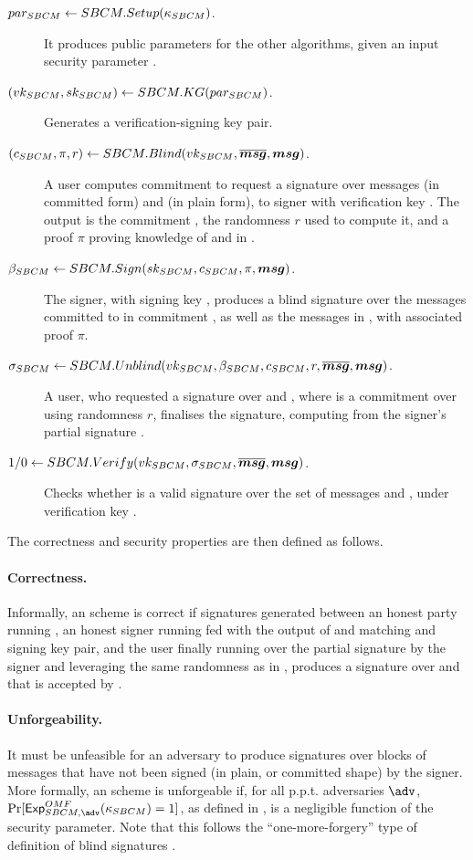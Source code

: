 \begin{description}
\item[$par_{SBCM} \gets SBCM.Setup(\kappa_{SBCM})$.] It produces public parameters
  for the other algorithms, given an input security parameter \SBCMsecpar.
\item[$(vk_{SBCM},sk_{SBCM}) \gets SBCM.KG(par_{SBCM})$.] Generates a
  verification-signing key pair.
\item[$(c_{SBCM},\pi,r) \gets SBCM.Blind(vk_{SBCM},\overline{\boldsymbol{msg}},\boldsymbol{msg})$.] A user
  computes commitment \SBCMcom to request a signature over messages \osmsg (in
  committed form) and \smsg (in plain form), to signer with verification key
  \SBCMvk. The output is the commitment \SBCMcom, the randomness $r$ used to
  compute it, and a proof $\pi$ proving knowledge of \osmsg and \smsg in
  \SBCMcom.
\item[$\beta_{SBCM} \gets SBCM.Sign(sk_{SBCM},c_{SBCM},\pi,\boldsymbol{msg})$.] The
  signer, with signing key \SBCMsk, produces a blind signature \SBCMbsig over
  the messages committed to in commitment \SBCMcom, as well as the messages in
  \smsg, with associated proof $\pi$.
\item[$\sigma_{SBCM} \gets SBCM.Unblind(vk_{SBCM},\beta_{SBCM},c_{SBCM},r,\overline{\boldsymbol{msg}},\boldsymbol{msg})$.]
  A user, who requested a signature over \osmsg and \smsg, where \SBCMcom is a
  commitment over \osmsg using randomness $r$, finalises the signature,
  computing \SBCMsig from the signer's partial signature \SBCMbsig.
\item[$1/0 \gets SBCM.Verify(vk_{SBCM},\sigma_{SBCM},\overline{\boldsymbol{msg}},\boldsymbol{msg})$.] Checks
  whether \SBCMsig is a valid signature over the set of messages \osmsg and
  \smsg, under verification key \SBCMvk.
\end{description}

The correctness and security properties are then defined as follows.

\paragraph{Correctness.} %
Informally, an \SBCM scheme is correct if signatures generated between an honest
party running \SBCMBlind, an honest signer running \SBCMSign fed with the output
of \SBCMBlind and matching \smsg and signing key pair, and the user finally
running \SBCMUnblind over the partial signature by the signer and leveraging
the same randomness as in \SBCMBlind, produces a signature over \osmsg and \smsg
that is accepted by \SBCMVerify. 

\paragraph{Unforgeability.} %
It must be unfeasible for an adversary to produce signatures over blocks of
messages that have not been signed (in plain, or committed shape) by the
signer. More formally, an \SBCM scheme is unforgeable if, for all p.p.t.
adversaries $\adv$, $\Pr[\ExpSBCMOMF(\SBCMsecpar) = 1]$, as defined in
, is a negligible function of the security parameter.
Note that this follows the ``one-more-forgery'' type of definition of blind
signatures \cite{bold02}.

